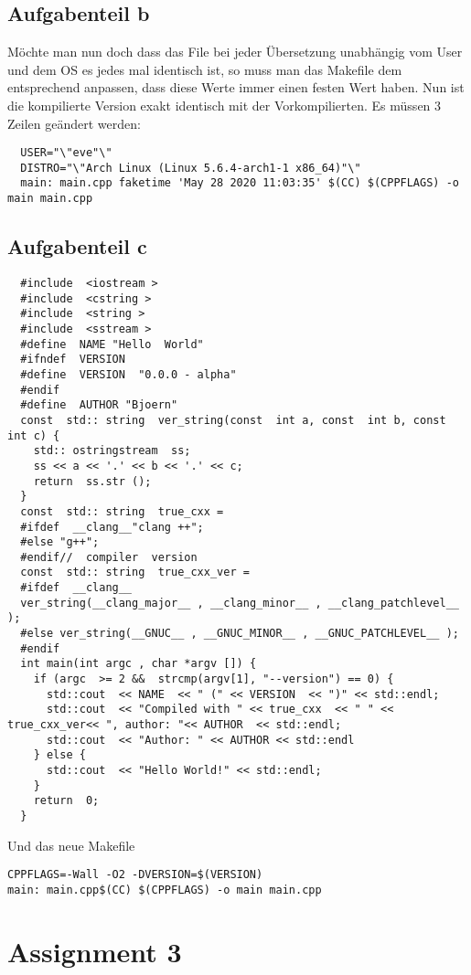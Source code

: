 \documentclass[a4paper,12pt,
headsepline,           %
oneside,               %
pointlessnumbers,      %
bibtotoc,              %
BCOR15mm               %
]{scrbook}
\begin{document}
\subsection*{Aufgabenteil b}
Möchte man nun doch dass das File bei jeder Übersetzung unabhängig vom User und dem OS es jedes mal identisch ist, so muss man das Makefile
dem entsprechend anpassen, dass diese Werte immer einen festen Wert haben. Nun ist die kompilierte Version exakt identisch mit der Vorkompilierten.
Es müssen 3 Zeilen geändert werden:
\begin{lstlisting}
  USER="\"eve"\"
  DISTRO="\"Arch Linux (Linux 5.6.4-arch1-1 x86_64)"\"
  main: main.cpp faketime 'May 28 2020 11:03:35' $(CC) $(CPPFLAGS) -o main main.cpp
\end{lstlisting}

\subsection*{Aufgabenteil c}
\begin{lstlisting}
  #include  <iostream >
  #include  <cstring >
  #include  <string >
  #include  <sstream >
  #define  NAME "Hello  World"
  #ifndef  VERSION
  #define  VERSION  "0.0.0 - alpha"
  #endif
  #define  AUTHOR "Bjoern"
  const  std:: string  ver_string(const  int a, const  int b, const  int c) {
    std:: ostringstream  ss;
    ss << a << '.' << b << '.' << c;
    return  ss.str ();
  }
  const  std:: string  true_cxx =
  #ifdef  __clang__"clang ++";
  #else "g++";
  #endif//  compiler  version
  const  std:: string  true_cxx_ver =
  #ifdef  __clang__
  ver_string(__clang_major__ , __clang_minor__ , __clang_patchlevel__ );
  #else ver_string(__GNUC__ , __GNUC_MINOR__ , __GNUC_PATCHLEVEL__ );
  #endif
  int main(int argc , char *argv []) {
    if (argc  >= 2 &&  strcmp(argv[1], "--version") == 0) {
      std::cout  << NAME  << " (" << VERSION  << ")" << std::endl;
      std::cout  << "Compiled with " << true_cxx  << " " << true_cxx_ver<< ", author: "<< AUTHOR  << std::endl;
      std::cout  << "Author: " << AUTHOR << std::endl
    } else {
      std::cout  << "Hello World!" << std::endl;
    }
    return  0;
  }
\end{lstlisting}
Und das neue Makefile
\begin{lstlisting}
CPPFLAGS=-Wall -O2 -DVERSION=$(VERSION)
main: main.cpp$(CC) $(CPPFLAGS) -o main main.cpp
\end{lstlisting}

\section*{Assignment 3}
\end{document}
